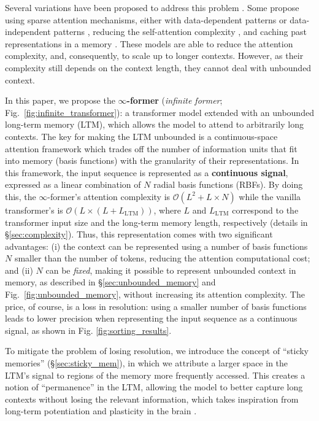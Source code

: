 \documentclass[11pt]{article}
\begin{document}
Several variations have been proposed to address this problem \citep{tay2020efficient}. Some propose using sparse attention mechanisms, either with data-dependent patterns \citep{kitaev2020reformer,vyas2020fast,tay2020sparse,roy2021efficient,wang2021cluster} or data-independent patterns \citep{child2019generating,beltagy2020longformer,zaheer2020big}, reducing the self-attention complexity \citep{katharopoulos2020transformers,choromanski2020rethinking,peng2021random,jaegle2021perceiver}, and caching past representations in a memory \citep{dai2019transformer,rae2019compressive}. 
These models are able to reduce the attention complexity, and, consequently, to scale up to longer contexts. However, as their complexity still depends on the context length, they cannot deal with unbounded context.

In this paper, we propose the \textbf{\mbox{$\infty$-former}} (\emph{infinite former}; Fig.~\ref{fig:infinite_transformer}): a transformer model extended with an unbounded long-term memory (LTM), which allows the model to attend to arbitrarily long contexts. 
The key for making the LTM unbounded is a continuous-space attention framework \citep{martins2020sparse} which trades off the number of information units that fit into memory (basis functions) with the granularity of their representations. 
In this framework, the input sequence is represented as a \textbf{continuous signal}, expressed as a linear combination of $N$ radial basis functions (RBFs). By doing this, the \mbox{$\infty$-former}'s attention complexity is ${\mathcal{O}(L^2 + L\times N)}$ while the vanilla transformer's is $ \mathcal{O}(L \times (L+L_{\mathrm{LTM}}))$, where $L$ and $L_{\mathrm{LTM}}$ correspond to the transformer input size and the long-term memory length, respectively (details in \S\ref{sec:complexity}).
Thus, this representation comes with two significant advantages: (i) the context can be represented using a number of basis functions $N$ smaller than the number of tokens, reducing the attention computational cost; and (ii) $N$ can be \textit{fixed}, making it possible to represent unbounded context in memory, as described in \S\ref{sec:unbounded_memory} and Fig.~\ref{fig:unbounded_memory}, without increasing its attention complexity. 
The price, of course, is a loss in resolution: using a smaller number of basis functions leads to lower precision when representing the input sequence as a continuous signal, as shown in Fig. \ref{fig:sorting_results}.

To mitigate the problem of losing resolution, we introduce the concept of ``sticky memories'' (\S\ref{sec:sticky_mem}), in which we attribute a larger space in the LTM's signal to regions of the memory more frequently accessed. This creates a notion of ``permanence'' in the LTM, allowing the model to better capture long contexts without losing the relevant information,  which takes inspiration from long-term potentiation and plasticity in the brain \citep{mills2014cognitive,bamji2005cadherins}.
\end{document}
